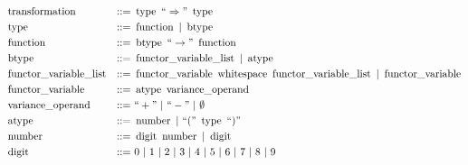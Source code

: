 \documentclass[../Dissertation.tex]{subfiles}
\begin{document}
\begin{align*}
  &\transformterminal &::=&\ \typeterminal\ ``\Rightarrow"\ \typeterminal\\
  &\typeterminal &::=&\ \functionterminal\ |\ \btypeterminal\\
  &\functionterminal &::=&\ \btypeterminal\ ``\rightarrow"\ \functionterminal\\
  &\btypeterminal &::=&\ \variablelistterminal\ |\ \atypeterminal\\
  &\variablelistterminal &::=&\ \variableterminal\ \whitespaceterminal\ \variablelistterminal\ |\ \variableterminal\\
  &\variableterminal &::=&\ \atypeterminal\ \varianceterminal\\
  &\varianceterminal &::=&\ ``+"\ |\ ``-"\ |\ \emptyset\\
  &\atypeterminal &::=&\ \numberterminal\ |\ ``("\ \typeterminal\ ``)"\\
  &\numberterminal &::=&\ \digitterminal\ \numberterminal\ |\ \digitterminal\\
  &\digitterminal &::=&\ 0\ |\ 1\ |\ 2\ |\ 3\ |\ 4\ |\ 5\ |\ 6\ |\ 7\ |\ 8\ |\ 9
\end{align*}
\end{document}
